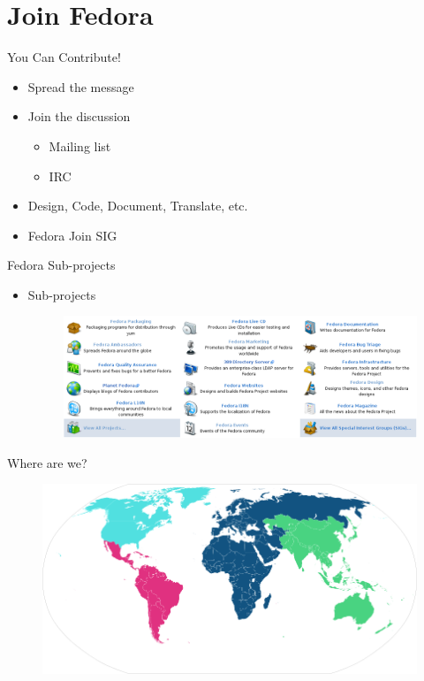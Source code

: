 \documentclass{beamer}
\begin{document}
\section{Join Fedora}

\begin{frame}{You Can Contribute!}
  \begin{itemize}
    \item Spread the message
    \item Join the discussion
      \begin{itemize}
        \item Mailing list
        \item IRC
      \end{itemize}
    \item Design, Code, Document, Translate, etc.
    \item Fedora Join SIG
  \end{itemize}
\end{frame}

\begin{frame}{Fedora Sub-projects}
  \begin{itemize}
    \item Sub-projects
      \begin{figure}[htbp]
        \centering
        \includegraphics[width=.9\textwidth]{subprojects.png}
      \end{figure}
  \end{itemize}
\end{frame}

\begin{frame}{Where are we?}
  \begin{figure}[htbp]
    \centering
    \includegraphics[width=\textwidth]{Ambassador-World-Map.png}
  \end{figure}
\end{frame}
\end{document}
